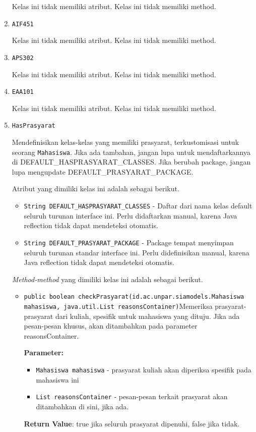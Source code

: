 \documentclass{article}
\begin{document}
\begin{enumerate}
Kelas ini tidak memiliki atribut. Kelas ini tidak memiliki method. \item \texttt{AIF451}



Kelas ini tidak memiliki atribut. Kelas ini tidak memiliki method. \item \texttt{APS302}



Kelas ini tidak memiliki atribut. Kelas ini tidak memiliki method. \item \texttt{EAA101}



Kelas ini tidak memiliki atribut. Kelas ini tidak memiliki method. \item \texttt{HasPrasyarat}

Mendefinisikan kelas-kelas yang memiliki prasyarat, terkustomisasi
 untuk seorang \texttt{Mahasiswa}. Jika ada tambahan, jangan lupa untuk
 mendaftarkannya di DEFAULT\_HASPRASYARAT\_CLASSES. Jika berubah package,
 jangan lupa mengupdate DEFAULT\_PRASYARAT\_PACKAGE.

Atribut yang dimiliki kelas ini adalah sebagai berikut.
\begin{itemize}
\item \texttt{String DEFAULT\_HASPRASYARAT\_CLASSES} - Daftar dari nama kelas default seluruh turunan interface ini. Perlu didaftarkan
 manual, karena Java reflection tidak dapat mendeteksi otomatis.
\item \texttt{String DEFAULT\_PRASYARAT\_PACKAGE} - Package tempat menyimpan seluruh turunan standar interface ini. Perlu didefinisikan
 manual, karena Java reflection tidak dapat mendeteksi otomatis.
\end{itemize}
\textit{Method-method} yang dimiliki kelas ini adalah sebagai berikut.
\begin{itemize}
\item \texttt{public boolean checkPrasyarat(id.ac.unpar.siamodels.Mahasiswa mahasiswa, java.util.List reasonsContainer)}Memeriksa prasyarat-prasyarat dari kuliah, spesifik untuk mahasiswa
 yang dituju. Jika ada pesan-pesan khusus, akan ditambahkan pada parameter
 reasonsContainer.

\textbf{Parameter:}
\begin{itemize}
\item \texttt{Mahasiswa mahasiswa} - 
prasyarat kuliah akan diperiksa spesifik pada mahasiswa ini
\item \texttt{List reasonsContainer} - 
pesan-pesan terkait prasyarat akan ditambahkan di sini, jika ada.
\end{itemize}
\textbf{Return Value}: true jika seluruh prasyarat dipenuhi, false jika tidak.


\end{itemize}
\end{enumerate}
\end{document}
